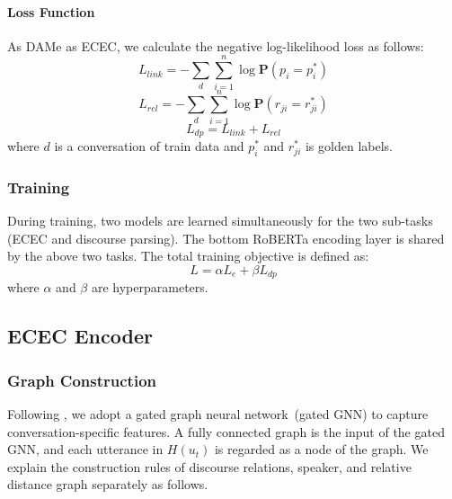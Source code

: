 \documentclass[11pt]{article}
\begin{document}
\paragraph{Loss Function}
As DAMe as ECEC, we calculate the negative log-likelihood loss as follows:
\begin{equation}
    L_{link} = - \sum_{d} \sum_{i=1}^n \log \mathbf{P}(p_i = p^*_i)
\end{equation}
\begin{equation}
    L_{rel} = - \sum_{d} \sum_{i=1}^n \log \mathbf{P}(r_{ji} = r^*_{ji})
\end{equation}
\begin{equation}
    L_{dp} = L_{link} + L_{rel}
\end{equation}
where $d$ is a conversation of train data and $p^*_i$ and $r^*_{ji}$ is golden labels.

\subsubsection{Training}
During training, two models are learned simultaneously for the two sub-tasks (ECEC and discourse parsing).
The bottom RoBERTa encoding layer is shared by the above two tasks.
The total training objective is defined as:
\begin{equation}
L=\alpha L_e +\beta L_{dp}
\end{equation}
where $\alpha$ and $\beta$ are hyperparameters.

\subsection{ECEC Encoder}\label{subsec:ECEC}

\subsubsection{Graph Construction}
Following \citet{wang2021structure,gatedgnn2016}, we adopt a gated graph neural network~(gated GNN) to capture conversation-specific features.
A fully connected graph is the input of the gated GNN, and each utterance in $H(u_t)$ is regarded as a node of the graph.
We explain the construction rules of discourse relations, speaker, and relative distance graph separately as follows.
\end{document}
